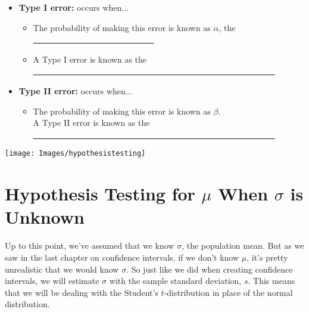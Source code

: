 \documentclass[12pt, letterpaper]{article}
\theoremstyle{definition}
\begin{document}
\begin{statement}
\begin{itemize}

\item \textbf{Type I error:} occurs when...
\vspace*{.5in}

\begin{itemize}
\item The probability of making this error is known as $\alpha$, the \underline{~~~~~~~~~~~~~~~~~~~~~~~~~~~~~}
\vspace*{.2in}

\item A Type I error is known as the \underline{~~~~~~~~~~~~~~~~~~~~~~~~~~~~~~~~~~~~~~~~~~~~~~~~~~~~~~~~~~} 
\end{itemize}


\item \textbf{Type II error:}  occurs when...
\vspace*{.5in}

\begin{itemize}

\item The probability of making this error is known as $\beta$.\\  

A Type II error is known as the \underline{~~~~~~~~~~~~~~~~~~~~~~~~~~~~~~~~~~~~~~~~~~~~~~~~~~~~~~~~~~}

\end{itemize}

\end{itemize}
\end{statement}


\begin{center}
\texttt{[image: Images/hypothesistesting]}
\end{center}


\section*{Hypothesis Testing for $\mu$ When $\sigma$ is Unknown}

\noindent Up to this point, we've assumed that we know $\sigma$, the population mean.  But as we saw in the last chapter on confidence intervals, if we don't know $\mu$, it's pretty unrealistic that we would know $\sigma$.  So just like we did when creating confidence intervals, we will estimate $\sigma$ with the sample standard deviation, $s$.  This means that we will be dealing with the Student's $t$-distribution in place of the normal distribution.
\end{document}
